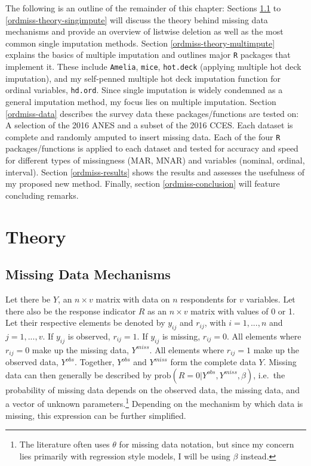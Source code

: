 \documentclass[12pt,econ]{sources/authesis}
\begin{document}
The following is an outline of the remainder of this chapter: Sections \ref{ordmiss-theory-mechanisms} to \ref{ordmiss-theory-singimpute} will discuss the theory behind missing data mechanisms and provide an overview of listwise deletion as well as the most common single imputation methods. Section \ref{ordmiss-theory-multimpute} explains the basics of multiple imputation and outlines major \texttt{R} packages that implement it. These include \texttt{Amelia}, \texttt{mice}, \texttt{hot.deck} (applying multiple hot deck imputation), and my self-penned multiple hot deck imputation function for ordinal variables, \texttt{hd.ord}. Since single imputation is widely condemned as a general imputation method, my focus lies on multiple imputation. Section \ref{ordmiss-data} describes the survey data these packages/functions are tested on: A selection of the 2016 ANES and a subset of the 2016 CCES. Each dataset is complete and randomly amputed to insert missing data. Each of the four \texttt{R} packages/functions is applied to each dataset and tested for accuracy and speed for different types of missingness (MAR, MNAR) and variables (nominal, ordinal, interval). Section \ref{ordmiss-results} shows the results and assesses the usefulness of my proposed new method. Finally, section \ref{ordmiss-conclusion} will feature concluding remarks.

\hypertarget{ordmiss-theory}{%
\section{Theory}\label{ordmiss-theory}}

\hypertarget{ordmiss-theory-mechanisms}{%
\subsection{Missing Data Mechanisms}\label{ordmiss-theory-mechanisms}}

Let there be \(Y\), an \(n \times v\) matrix with data on \(n\) respondents for \(v\) variables. Let there also be the response indicator \(R\) as an \(n \times v\) matrix with values of 0 or 1. Let their respective elements be denoted by \(y_{ij}\) and \(r_{ij}\), with \(i = 1, ..., n\) and \(j = 1, ..., v\). If \(y_{ij}\) is observed, \(r_{ij} = 1\). If \(y_{ij}\) is missing, \(r_{ij} = 0\). All elements where \(r_{ij} = 0\) make up the missing data, \(Y^{miss}\). All elements where \(r_{ij} = 1\) make up the observed data, \(Y^{obs}\). Together, \(Y^{obs}\) and \(Y^{miss}\) form the complete data \(Y\). Missing data can then generally be described by \(\text{prob}(R = 0 | Y^{obs}, Y^{miss}, \beta)\), i.e.~the probability of missing data depends on the observed data, the missing data, and a vector of unknown parameters.\footnote{The literature often uses \(\theta\) for missing data notation, but since my concern lies primarily with regression style models, I will be using \(\beta\) instead.} Depending on the mechanism by which data is missing, this expression can be further simplified.
\end{document}

